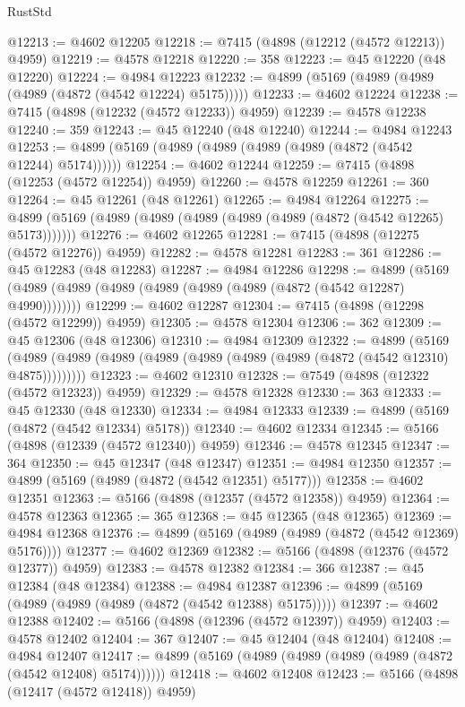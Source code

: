 \begin{lexlean}{RustStd}
\begin{coremodule}
@12213 := @4602 @12205
@12218 := @7415 (@4898 (@12212 (@4572 @12213)) @4959)
@12219 := @4578 @12218
@12220 := 358
@12223 := @45 @12220 (@48 @12220)
@12224 := @4984 @12223
@12232 := @4899 (@5169 (@4989 (@4989 (@4989 (@4872 (@4542 @12224) @5175)))))
@12233 := @4602 @12224
@12238 := @7415 (@4898 (@12232 (@4572 @12233)) @4959)
@12239 := @4578 @12238
@12240 := 359
@12243 := @45 @12240 (@48 @12240)
@12244 := @4984 @12243
@12253 := @4899 (@5169 (@4989 (@4989 (@4989 (@4989 (@4872 (@4542 @12244) @5174))))))
@12254 := @4602 @12244
@12259 := @7415 (@4898 (@12253 (@4572 @12254)) @4959)
@12260 := @4578 @12259
@12261 := 360
@12264 := @45 @12261 (@48 @12261)
@12265 := @4984 @12264
@12275 := @4899 (@5169 (@4989 (@4989 (@4989 (@4989 (@4989 (@4872 (@4542 @12265) @5173)))))))
@12276 := @4602 @12265
@12281 := @7415 (@4898 (@12275 (@4572 @12276)) @4959)
@12282 := @4578 @12281
@12283 := 361
@12286 := @45 @12283 (@48 @12283)
@12287 := @4984 @12286
@12298 := @4899 (@5169 (@4989 (@4989 (@4989 (@4989 (@4989 (@4989 (@4872 (@4542 @12287) @4990))))))))
@12299 := @4602 @12287
@12304 := @7415 (@4898 (@12298 (@4572 @12299)) @4959)
@12305 := @4578 @12304
@12306 := 362
@12309 := @45 @12306 (@48 @12306)
@12310 := @4984 @12309
@12322 := @4899
    (@5169 (@4989 (@4989 (@4989 (@4989 (@4989 (@4989 (@4989 (@4872 (@4542 @12310) @4875)))))))))
@12323 := @4602 @12310
@12328 := @7549 (@4898 (@12322 (@4572 @12323)) @4959)
@12329 := @4578 @12328
@12330 := 363
@12333 := @45 @12330 (@48 @12330)
@12334 := @4984 @12333
@12339 := @4899 (@5169 (@4872 (@4542 @12334) @5178))
@12340 := @4602 @12334
@12345 := @5166 (@4898 (@12339 (@4572 @12340)) @4959)
@12346 := @4578 @12345
@12347 := 364
@12350 := @45 @12347 (@48 @12347)
@12351 := @4984 @12350
@12357 := @4899 (@5169 (@4989 (@4872 (@4542 @12351) @5177)))
@12358 := @4602 @12351
@12363 := @5166 (@4898 (@12357 (@4572 @12358)) @4959)
@12364 := @4578 @12363
@12365 := 365
@12368 := @45 @12365 (@48 @12365)
@12369 := @4984 @12368
@12376 := @4899 (@5169 (@4989 (@4989 (@4872 (@4542 @12369) @5176))))
@12377 := @4602 @12369
@12382 := @5166 (@4898 (@12376 (@4572 @12377)) @4959)
@12383 := @4578 @12382
@12384 := 366
@12387 := @45 @12384 (@48 @12384)
@12388 := @4984 @12387
@12396 := @4899 (@5169 (@4989 (@4989 (@4989 (@4872 (@4542 @12388) @5175)))))
@12397 := @4602 @12388
@12402 := @5166 (@4898 (@12396 (@4572 @12397)) @4959)
@12403 := @4578 @12402
@12404 := 367
@12407 := @45 @12404 (@48 @12404)
@12408 := @4984 @12407
@12417 := @4899 (@5169 (@4989 (@4989 (@4989 (@4989 (@4872 (@4542 @12408) @5174))))))
@12418 := @4602 @12408
@12423 := @5166 (@4898 (@12417 (@4572 @12418)) @4959)

\end{coremodule}
\end{lexlean}

